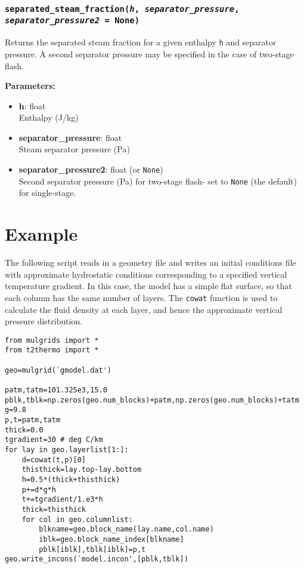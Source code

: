 \begin{snugshade}
\subsubsection{\texttt{separated\_steam\_fraction(\emph{h}, \emph{separator\_pressure}, \emph{separator\_pressure2} = None)}}
\end{snugshade}
\label{sec:t2thermo:separated_steam_fraction}

Returns the separated steam fraction for a given enthalpy \texttt{h} and separator pressure.  A second separator pressure may be specified in the case of two-stage flash.

\textbf{Parameters:}
\begin{itemize}
\item \textbf{h}: float\\
  Enthalpy (J/kg)
\item \textbf{separator\_pressure}: float\\
  Steam separator pressure (Pa)
\item \textbf{separator\_pressure2}: float (or \texttt{None})\\
  Second separator pressure (Pa) for two-stage flash- set to \texttt{None} (the default) for single-stage.
\end{itemize}

\section{Example}

The following script reads in a geometry file and writes an initial conditions file with approximate hydrostatic conditions corresponding to a specified vertical temperature gradient.  In this case, the model has a simple flat surface, so that each column has the same number of layers.  The \texttt{cowat} function is used to calculate the fluid density at each layer, and hence the approximate vertical pressure distribution.

\begin{verbatim}
from mulgrids import *
from t2thermo import *

geo=mulgrid(`gmodel.dat')

patm,tatm=101.325e3,15.0
pblk,tblk=np.zeros(geo.num_blocks)+patm,np.zeros(geo.num_blocks)+tatm
g=9.8
p,t=patm,tatm
thick=0.0
tgradient=30 # deg C/km
for lay in geo.layerlist[1:]:
    d=cowat(t,p)[0]
    thisthick=lay.top-lay.bottom
    h=0.5*(thick+thisthick)
    p+=d*g*h
    t+=tgradient/1.e3*h
    thick=thisthick
    for col in geo.columnlist:
        blkname=geo.block_name(lay.name,col.name)
        iblk=geo.block_name_index[blkname]
        pblk[iblk],tblk[iblk]=p,t
geo.write_incons(`model.incon',[pblk,tblk])
\end{verbatim}
